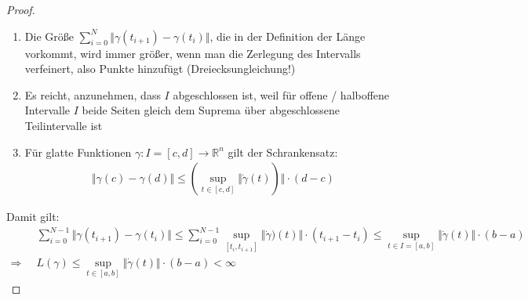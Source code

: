 \begin{proof}\hspace*{0pt}
	\vspace*{\dimexpr-\baselineskip+1mm\relax}
	\begin{enumerate}[label={\arabic*)}]
		\item Die Größe $\sum_{i=0}^N \Vert \gamma(t_{i+1}) - \gamma(t_i)\Vert$, die in der Definition der Länge vorkommt, wird immer größer, wenn man die Zerlegung des Intervalls verfeinert, also Punkte hinzufügt (Dreiecksungleichung!)
		\item Es reicht, anzunehmen, dass $I$ abgeschlossen ist, weil für offene / halboffene Intervalle $I$ beide Seiten gleich dem Suprema über abgeschlossene Teilintervalle ist
		\item Für glatte Funktionen $\gamma\!: I=[c,d] \to \mathbb{R}^n$ gilt der Schrankensatz: \begin{align*}
			\Vert \gamma(c) - \gamma(d) \Vert \le \left(\sup\limits_{t\in [c,d]} \Vert \dot{\gamma}(t)\right) \Vert \cdot (d-c)
		\end{align*}
	\end{enumerate}
	Damit gilt: \begin{align*}
		&\sum_{i=0}^{N-1} \Vert \gamma(t_{i+1}) - \gamma(t_i)\Vert \le \sum_{i=0}^{N-1} \sup\limits_{[t_i, t_{i+1}]} \Vert \dot{\gamma})(t)\Vert \cdot ( t_{i+1} - t_i)\le \sup\limits_{t\in I=[a,b]} \Vert \dot{\gamma}(t) \Vert \cdot (b - a) \\
		\Rightarrow\;\;& L(\gamma) \le \sup\limits_{t\in[a,b]} \Vert \dot{\gamma}(t)\Vert \cdot (b- a) < \infty
	\end{align*}
	

\end{proof}
